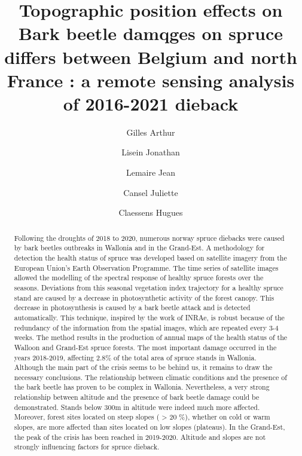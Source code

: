 \documentclass[3p,procedia]{elsarticle}
\begin{document}
\begin{frontmatter}

\author[label2]{Gilles Arthur}
\author[label2]{Lisein Jonathan}
\author[label3]{Lemaire Jean}
\author[label3]{Cansel Juliette}
\author[label2]{Claessens Hugues}



\title{Topographic position effects on Bark beetle damqges on spruce differs between Belgium and north France : a remote sensing analysis of 2016-2021 dieback}

\begin{abstract}
Following the droughts of 2018 to 2020, numerous norway spruce diebacks were caused by bark beetles 
outbreaks in Wallonia and in the Grand-Est. 
A methodology for detection the health status of spruce was developed based on satellite imagery from the European Union's Earth Observation Programme.
The time series of satellite images allowed the modelling of the spectral response of healthy spruce forests over the seasons. Deviations from this seasonal vegetation index trajectory for a healthy spruce stand are caused by a decrease in photosynthetic activity of the forest canopy.
This decrease in photosynthesis is caused by a bark beetle attack and is detected automatically.
This technique, inspired by the work of INRAe, is robust because of the redundancy of the information from the spatial images, which are repeated every 3-4 weeks. 
The method results in the production of annual maps of the health status of the Walloon and Grand-Est spruce forests.
The most important damage occurred in the years 2018-2019, affecting 2.8\% of the total area of spruce stands in Wallonia.
Although the main part of the crisis seems to be behind us, it remains to draw the necessary conclusions.
The relationship between climatic conditions and the presence of the bark beetle has proven to be complex in Wallonia.
Nevertheless, a very strong relationship between altitude and the presence of bark beetle damage could be demonstrated.
Stands below 300m in altitude were indeed much more affected.
Moreover, forest sites located on steep slopes ( > 20 \%), whether on cold or warm slopes, are more affected than sites located on low slopes (plateaus).
In the Grand-Est, the peak of the crisis has been reached in 2019-2020. Altitude and slopes are not strongly influencing factors for spruce dieback. 


\end{abstract}

\begin{keyword}
\end{keyword}

\end{frontmatter}
\end{document}
